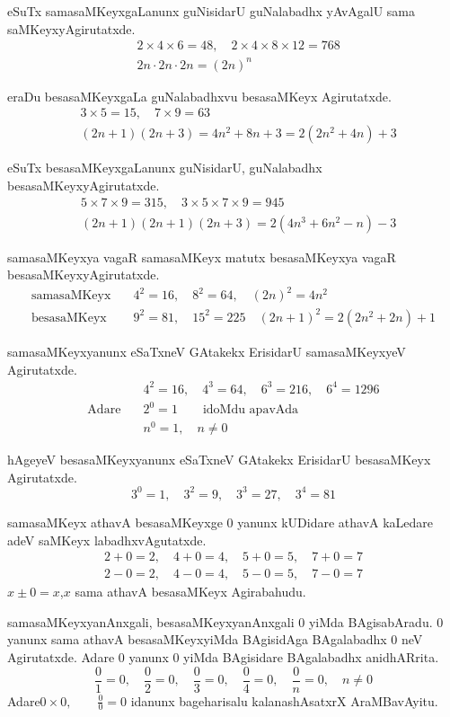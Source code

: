 eSuTx samasaMKeyxgaLanunx guNisidarU guNalabadhx yAvAgalU sama saMKeyxyAgirutatxde.
\begin{align*}
&2\times 4\times 6 = 48, \quad 2\times 4 \times 8 \times 12 =768\\
& 2n\cdot 2n\cdot 2n = (2n)^n 
\end{align*}

eraDu besasaMKeyxgaLa guNalabadhxvu besasaMKeyx Agirutatxde.
\begin{align*}
& 3\times 5=15, \quad 7\times 9=63\\
& (2n+1)(2n+3) = 4n^{2}+8n+3=2(2n^{2}+4n)+3
\end{align*}

eSuTx besasaMKeyxgaLanunx guNisidarU, guNalabadhx besasaMKeyxyAgirutatxde.
\begin{align*}
&5\times 7\times 9 =315, \quad 3\times 5\times 7 \times 9 = 945\\
&(2n+1)(2n+1)(2n+3) = 2(4n^{3} + 6n^{2}-n)-3
\end{align*}

samasaMKeyxya vagaR samasaMKeyx matutx besasaMKeyxya vagaR besasaMKeyxyAgirutatxde.
\begin{align*}
\text{samasaMKeyx}&\quad 4^{2} =16, \quad 8^{2}=64, \quad (2n)^{2} = 4n^{2}\\
\text{besasaMKeyx}&\quad 9^{2} =81, \quad 15^{2}=225 \quad (2n+1)^{2}=2(2n^{2}+2n)+1
\end{align*}

samasaMKeyxyanunx eSaTxneV GAtakekx ErisidarU samasaMKeyxyeV Agirutatxde.
\begin{align*}
&\quad 4^{2}=16, \quad 4^{3}=64, \quad 6^{3}=216, \quad 6^{4}=1296\\
\text{Adare} &\quad 2^{0} = 1 \qquad \text{idoMdu apavAda}\\
&\quad n^{0}=1,\quad n\neq 0 
\end{align*}

hAgeyeV besasaMKeyxyanunx eSaTxneV GAtakekx ErisidarU besasaMKeyx Agirutatxde.
$$
3^{0}=1, \quad 3^{2}=9, \quad 3^{3}=27, \quad 3^{4}=81
$$

samasaMKeyx athavA besasaMKeyxge $0$ yanunx kUDidare athavA kaLedare adeV saMKeyx labadhxvAgutatxde.
\begin{align*}
2+0 =2, \quad 4+0=4, \quad 5+0=5, \quad 7+0=7\\
2-0 =2, \quad 4-0=4, \quad 5-0=5, \quad 7-0=7
\end{align*}
$x\pm 0 =x$,\quad $x$ sama athavA besasaMKeyx Agirabahudu. 

samasaMKeyxyanAnxgali, besasaMKeyxyanAnxgali $0$ yiMda BAgisabAradu. $0$ yanunx sama athavA besasaMKeyxyiMda BAgisidAga BAgalabadhx $0$ neV Agirutatxde. Adare $0$ yanunx $0$ yiMda BAgisidare BAgalabadhx anidhARrita.
$$
\frac{0}{1} = 0, \quad \frac{0}{2}=0,\quad \frac{0}{3}=0, \quad \frac{0}{4}=0, \quad \frac{0}{n} = 0, \quad n\neq 0
$$
Adare\quad $0\times 0,\quad \quad \frac{0}{0}=0$ idanunx bageharisalu kalanashAsatxrX AraMBavAyitu.  
